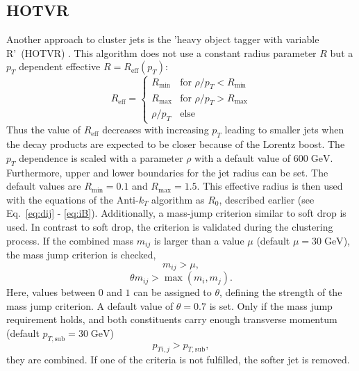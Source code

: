 \subsection{HOTVR}
\label{sec:HOTVR}
	Another approach to cluster jets is the 'heavy object tagger with variable R'~(HOTVR) \cite{hotvr}. This algorithm does not use a constant radius parameter $R$ but a $p_T$ dependent effective $R=R_\text{eff}(p_T)$:
	\begin{equation}
	\label{eq:HOTVR}
	  R_\text{eff} =
	   \begin{cases}
	     R_\text{min} & \text{for } \rho / p_T < R_\text{min} \\
	     R_\text{max} & \text{for } \rho / p_T > R_\text{max} \\
	     \rho / p_T & \text{else}  
	   \end{cases}
	\end{equation}
	 Thus the value of $R_\text{eff}$ decreases with increasing $p_T$ leading to smaller jets when the decay products are expected to be closer because of the Lorentz boost. The $p_T$ dependence is scaled with a parameter $\rho$ with a default value of $600\;\text{GeV}$. Furthermore, upper and lower boundaries for the jet radius can be set. The default values are $R_\text{min} = 0.1$ and $R_\text{max} = 1.5$. This effective radius is then used with the equations of the Anti-$k_T$ algorithm as $R_0$, described earlier (see Eq.~\ref{eq:dij} - \ref{eq:iB}). Additionally, a mass-jump criterion similar to soft drop is used. In contrast to soft drop, the criterion is validated during the clustering process. If the combined mass $m_{ij}$ is larger than a value $\mu$ (default $\mu = 30\;\text{GeV}$), the mass jump criterion is checked,
	\begin{equation}
	m_{ij} > \mu,
	\label{eq:hotvr_mij}
	\end{equation}
	\begin{equation}
	\theta m_{ij} > \max(m_i, m_j).
	\label{eq:hotvr_theta}
	\end{equation}
	Here, values between $0$ and $1$ can be assigned to $\theta$, defining the strength of the mass jump criterion. A default value of $\theta =0.7$ is set. Only if the mass jump requirement holds, and both constituents carry enough transverse momentum (default $p_{T,\text{sub}} = 30\;\text{GeV}$)
	\begin{equation}
	p_{Ti,j} > p_{T,\text{sub}},
	\label{eq:hotvr_pt}
	\end{equation}	
	they are combined. If one of the criteria is not fulfilled, the softer jet is removed.
	
